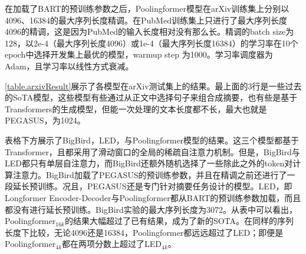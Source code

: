 在加载了BART的预训练参数之后，Poolingformer模型在arXiv训练集上分别以4096、16384的最大序列长度精调。在PubMed训练集上只进行了最大序列长度4096的精调，这是因为PubMed的输入长度相对没有那么长。精调的batch size为128，以2e-4（最大序列长度4096）或1e-4（最大序列长度16384）的学习率在10个epoch中选择开发集上最优的模型，warmup step 为1000。学习率调度器为Adam\cite{kingma2014adam}，且学习率以线性方式衰减。

\autoref{table.arxivResult}展示了各模型在arXiv测试集上的结果。最上面的3行是一些过去的SoTA模型，这些模型有些通过从正文中选择句子来组合成摘要，也有些是基于Transformers的生成模型，但能一次处理的文本长度都不长，最大也就是PEGASUS\cite{zhang2020pegasus}，为1024。

表格下方展示了BigBird，LED，与Poolingformer模型的结果。这三个模型都基于Transformer，且都采用了滑动窗口的全局的稀疏自注意力机制。但是，BigBird与LED都只有单层自注意力，而BigBird还额外随机选择了一些除此之外的token对计算注意力。BigBird加载了PEGASUS的预训练参数，并且在精调之前还进行了一段延长预训练。况且，PEGASUS还是专门针对摘要任务设计的模型。LED，即Longformer Encoder-Decoder与Poolingformer都从BART的预训练参数加载，而且都没有进行延长预训练。BigBird实验的最大序列长度为3072。从表中可以看出，Poolingformer$_{16k}$的结果大幅超过了已有结果，成为了新的SOTA。在同样的序列长度下比较，无论4096还是16384，Poolingformer都远远超过了LED；即便是Poolingformer$_{4k}$都在两项分数上超过了LED$_{4k}$。

\begin{table}[ht]
\caption{ 相关模型在PubMed测试集上的结果。}
\label{table.pubmedResult}
\begin{center}
\end{center}
\end{table}

